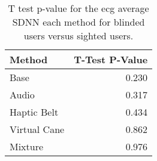 
\begin{table}[!htb]
\centering
\caption{T test p-value for the ecg average SDNN each method for blinded users versus sighted users.}
\label{tab:ttest_ecg_sdnn}
\begin{tabular}{lr}
\toprule
      Method &  T-Test P-Value \\
\midrule
        Base &           0.230 \\
       Audio &           0.317 \\
 Haptic Belt &           0.434 \\
Virtual Cane &           0.862 \\
     Mixture &           0.976 \\
\bottomrule
\end{tabular}
\end{table}

